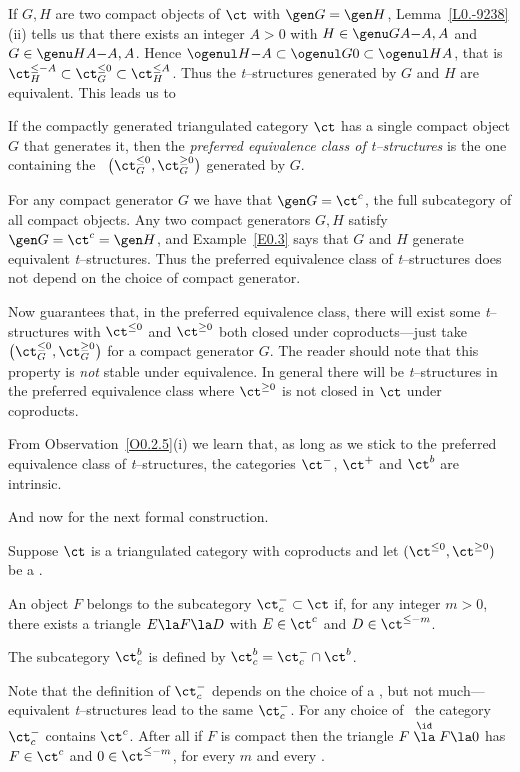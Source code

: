 \documentclass[11pt]{amsart}
\begin{document}
If $G,H$ are two compact objects of $\ct$ with $\gen G{}=\gen H{}$,
Lemma~\ref{L0.-9238}(ii) tells us that
there exists an integer $A>0$ with $H\in\genu GA{-A,A}$
and $G\in\genu HA{-A,A}$. Hence
$\ogenul H{}{-A}\subset \ogenul G{}0\subset \ogenul H{}A$, that is
$\ct_H^{\leq-A}\subset\ct_G^{\leq0}\subset\ct^{\leq A}_H$.
Thus the {\it t}--structures generated by $G$ and $H$
are equivalent. This leads us to
\eexm

If the compactly
generated triangulated category $\ct$ has a
single compact object $G$
that generates it, then
the \emph{preferred equivalence class of {\it t}--structures} is
the one containing the \tstr\
$\big(\ct_G^{\leq0},\ct_G^{\geq0}\big)$  generated by $G$. 
\edfn

For any compact generator $G$ we have that $\gen G{}=\ct^c$, the full
subcategory of all compact objects. Any two compact generators $G,H$ satisfy
$\gen G{}=\ct^c=\gen H{}$, and Example~\ref{E0.3} says that $G$ and $H$ generate
equivalent {\it t}--structures. Thus the preferred equivalence class
of {\it t}--structures does not depend on the choice of compact generator.

Now
\cite[Proposition~A.2]{Alonso-Jeremias-Souto03} guarantees
that, in the preferred equivalence class, there will exist some
{\it t}--structures with
$\ct^{\leq0}$ and $\ct^{\geq0}$ both closed under coproducts---just
take $\big(\ct_G^{\leq0},\ct_G^{\geq0}\big)$ for a compact
generator $G$.
The reader should note that this property is \emph{not} stable under
equivalence. 
In general there will be {\it t}--structures in the preferred
equivalence class where $\ct^{\geq0}$
is not closed in $\ct$ under coproducts.  


From Observation~\ref{O0.2.5}(i) we learn that, as long as we
stick to the preferred equivalence class of
{\it t}--structures, the categories $\ct^-$,
$\ct^+$ and $\ct^b$ are intrinsic.
\ermk

And now for the next formal construction.

Suppose $\ct$ is a triangulated category with coproducts
and let $(\ct^{\leq0},\ct^{\geq0})$ be a \tstr.

An object $F$ belongs to the subcategory $\ct_c^-\subset\ct$ if, for
any 
integer $m>0$, there exists a triangle
$E\la F\la D$ with $E\in\ct^c$ and $D\in\ct^{\leq-m}$.

The subcategory $\ct^b_c$ is defined by $\ct^b_c=\ct^-_c\cap\ct^b$.
\edfn

Note that the definition of $\ct^-_c$ depends on the choice of a \tstr,
but not much---equivalent {\it t}--structures lead to the same
$\ct^-_c$. For any choice of \tstr\ the category
$\ct^-_c$ contains $\ct^c$. After all if $F$ is compact
then the triangle $F\stackrel\id\la F\la 0$ has $F\in\ct^c$
and $0\in\ct^{\leq-m}$, for every $m$ and every \tstr.
\ermk
\end{document}
